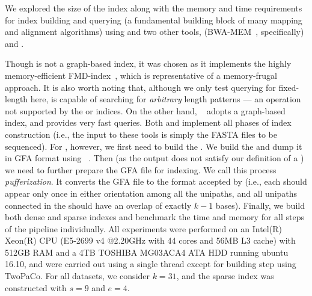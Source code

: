 We explored the size of the index along with the memory and time requirements for index building and \kmer querying (a fundamental building block of many mapping and alignment algorithms)
using \pufferfish and two other tools, \bwa (BWA-MEM~\citep{li2013aligning}, specifically) and \kallisto.

Though \bwa is not a graph-based index, it was chosen as it implements the
highly memory-efficient FMD-index~\citep{li2013aligning}, which is representative of a memory-frugal
approach.  It is also worth noting that, although we only test querying for fixed-length \kmers here, \bwa is capable of searching for \emph{arbitrary} length patterns --- an operation not supported by the
\kallisto or \pufferfish indices. On the other hand, \kallisto~\citep{Bray2016Kallisto} adopts a graph-based index, and provides very fast \kmer queries. Both \bwa and \kallisto implement all phases of index
construction (i.e., the input to these tools is simply the FASTA files to be sequenced). For \pufferfish, however, we first need to build the \ccdbg. We build the \ccdbg and dump it in GFA format using \twopaco~\citep{minkin2016twopaco}. Then (as the output does not satisfy our definition of a \ccdbg) we need to further prepare the GFA file for indexing. We call this process \emph{pufferization}. It
converts the GFA file to the format accepted by \pufferfish (i.e., each \kmer
should appear only once in either orientation among all the unipaths, and all
unipaths connected in the \ccdbg should have an overlap of exactly $k-1$ bases).
Finally, we build both dense and sparse \pufferfish indexes and benchmark the time and
memory for all steps of the pipeline individually. All experiments were
performed on an Intel(R) Xeon(R) CPU (E5-2699 v4 @2.20GHz with 44 cores and 56MB
L3 cache) with 512GB RAM and a 4TB TOSHIBA MG03ACA4 ATA HDD running ubuntu
16.10, and were carried out using a single thread except for \ccdbg building
step using TwoPaCo. For all datasets, we consider $k=31$, and the sparse \pufferfish index was constructed
with $s=9$ and $e=4$.

